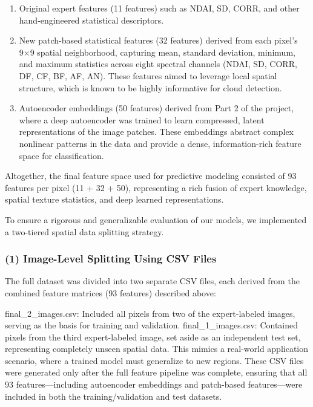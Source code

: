 \documentclass[11pt]{article}
\begin{document}
\begin{enumerate}
\def\labelenumi{(\arabic{enumi})}
\item
  Original expert features (11 features) such as NDAI, SD, CORR, and
  other hand-engineered statistical descriptors.
\item
  New patch-based statistical features (32 features) derived from each
  pixel's 9×9 spatial neighborhood, capturing mean, standard deviation,
  minimum, and maximum statistics across eight spectral channels (NDAI,
  SD, CORR, DF, CF, BF, AF, AN). These features aimed to leverage local
  spatial structure, which is known to be highly informative for cloud
  detection.
\item
  Autoencoder embeddings (50 features) derived from Part 2 of the
  project, where a deep autoencoder was trained to learn compressed,
  latent representations of the image patches. These embeddings abstract
  complex nonlinear patterns in the data and provide a dense,
  information-rich feature space for classification.
\end{enumerate}

Altogether, the final feature space used for predictive modeling
consisted of 93 features per pixel (11 + 32 + 50), representing a rich
fusion of expert knowledge, spatial texture statistics, and deep learned
representations.

    To ensure a rigorous and generalizable evaluation of our models, we
implemented a two-tiered spatial data splitting strategy.

\subsubsection*{(1) Image-Level Splitting Using CSV
Files}\label{image-level-splitting-using-csv-files}

The full dataset was divided into two separate CSV files, each derived
from the combined feature matrices (93 features) described above:

final\_2\_images.csv: Included all pixels from two of the expert-labeled
images, serving as the basis for training and validation.
final\_1\_images.csv: Contained pixels from the third expert-labeled
image, set aside as an independent test set, representing completely
unseen spatial data. This mimics a real-world application scenario,
where a trained model must generalize to new regions. These CSV files
were generated only after the full feature pipeline was complete,
ensuring that all 93 features---including autoencoder embeddings and
patch-based features---were included in both the training/validation and
test datasets.
\end{document}
